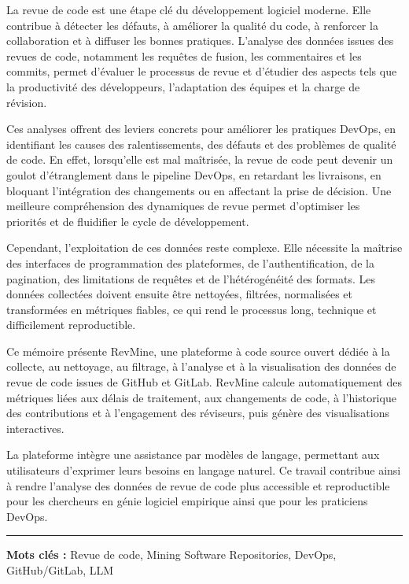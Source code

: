 
La revue de code est une étape clé du développement logiciel moderne. Elle contribue à détecter les défauts, à améliorer la qualité du code, à renforcer la collaboration et à diffuser les bonnes pratiques. L’analyse des données issues des revues de code, notamment les requêtes de fusion, les commentaires et les commits, permet d’évaluer le processus de revue et d’étudier des aspects tels que la productivité des développeurs, l’adaptation des équipes et la charge de révision.

Ces analyses offrent des leviers concrets pour améliorer les pratiques DevOps, en identifiant les causes des ralentissements, des défauts et des problèmes de qualité de code. En effet, lorsqu’elle est mal maîtrisée, la revue de code peut devenir un goulot d’étranglement dans le pipeline DevOps, en retardant les livraisons, en bloquant l’intégration des changements ou en affectant la prise de décision. Une meilleure compréhension des dynamiques de revue permet d’optimiser les priorités et de fluidifier le cycle de développement.

Cependant, l’exploitation de ces données reste complexe. Elle nécessite la maîtrise des interfaces de programmation des plateformes, de l’authentification, de la pagination, des limitations de requêtes et de l’hétérogénéité des formats. Les données collectées doivent ensuite être nettoyées, filtrées, normalisées et transformées en métriques fiables, ce qui rend le processus long, technique et difficilement reproductible.

Ce mémoire présente RevMine, une plateforme à code source ouvert dédiée à la collecte, au nettoyage, au filtrage, à l’analyse et à la visualisation des données de revue de code issues de GitHub et GitLab. RevMine calcule automatiquement des métriques liées aux délais de traitement, aux changements de code, à l’historique des contributions et à l’engagement des réviseurs, puis génère des visualisations interactives.

La plateforme intègre une assistance par modèles de langage, permettant aux utilisateurs d’exprimer leurs besoins en langage naturel. Ce travail contribue ainsi à rendre l’analyse des données de revue de code plus accessible et reproductible pour les chercheurs en génie logiciel empirique ainsi que pour les praticiens DevOps.

\vspace{1em}
\noindent\rule[2pt]{\textwidth}{0.5pt}

\noindent\textbf{Mots clés :} Revue de code, Mining Software Repositories, DevOps, GitHub/GitLab, LLM

